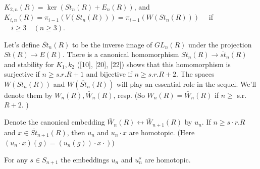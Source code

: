 \begin{lemm}
    $K_{2, n}(R)=\operatorname{ker}\left(S t_n(R)+E_n(R)\right)$, and $K_{i, n}(R)=\pi_{i-1}\left(V\left(S t_n(R)\right)\right)=\pi_{i-1}\left(W\left(S t_n(R)\right)\right) \quad$ if $\quad i \geq 3 \quad(n \geq 3)$.
\end{lemm}    

Let's define $\overline{S t}_n(R)$ to be the inverse image of $G L_n(R)$ under the projection $S t(R) \rightarrow E(R)$. There is a canonical homomorphism $S t_n(R) \rightarrow \overline{s t}_n(R)$ and stability for $K_1, k_2$ ([10], [20], [22]) shows that this homomorphism is surjective if $n \geq s . r . R+1$ and bijective if $n \geq s . r . R+2$. The spaces $W\left(S t_n(R)\right)$ and $W\left(\overline{S t}_n(R)\right)$ will play an essential role in the sequel. We'll denote them by $W_n(R), \bar{W}_n(R)$, resp. (So $W_n(R)=\bar{W}_n(R)$ if $n \geq$ s.r. $R+2$. )

\begin{lemm}
Denote the canonical embedding $\bar{W}_n(R) \longleftrightarrow \bar{W}_{n+1}(R)$ by $u_n$. If $n \geq s \cdot r . R$ and $x \in \overline{S t}_{n+1}(R)$, then $u_n$ and $u_n \cdot x$ are homotopic. (Here $\left.\left(u_n \cdot x\right)(g)=\left(u_n(g)\right) \cdot x \cdot\right)$)
\end{lemm}

\begin{lemm}
For any $s \in S_{n+1}$ the embeddings $u_n$ and $u_n^s$ are homotopic.   
\end{lemm}


